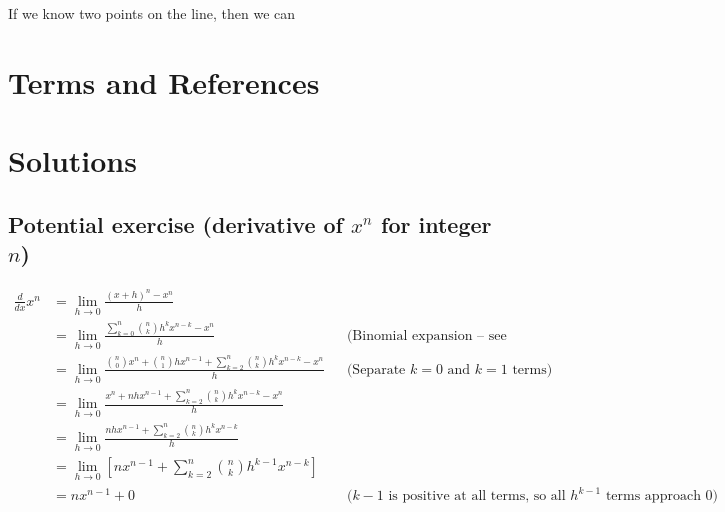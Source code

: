 If we know two points on the line, then we can 



\newpage
\section{Terms and References}

\section{Solutions}

\subsection{Potential exercise (derivative of $x^n$ for integer $n$)}

\begin{align*}
\frac{d}{dx}x^n &= \lim_{h \rightarrow 0} \frac{(x+h)^n - x^n}{h} \\
&= \lim_{h \rightarrow 0} \frac{\sum_{k=0}^n \binom{n}{k}h^k x^{n-k} - x^n}{h} && \text{(Binomial expansion -- see chapter)} \\
&= \lim_{h \rightarrow 0} \frac{\binom{n}{0}x^n + \binom{n}{1}hx^{n-1} + \sum_{k=2}^n \binom{n}{k}h^k x^{n-k} - x^n}{h} && \text{(Separate $k=0$ and $k=1$ terms)} \\
&= \lim_{h \rightarrow 0} \frac{x^n + nhx^{n-1} + \sum_{k=2}^n \binom{n}{k}h^k x^{n-k} - x^n}{h} \\
&= \lim_{h \rightarrow 0} \frac{nhx^{n-1} + \sum_{k=2}^n \binom{n}{k}h^k x^{n-k}}{h} \\
&= \lim_{h \rightarrow 0} \left[nx^{n-1} + \sum_{k=2}^n \binom{n}{k}h^{k-1} x^{n-k}\right] \\
&= nx^{n-1} + 0 && \text{($k-1$ is positive at all terms, so all $h^{k-1}$ terms approach 0)}\\
\end{align*}
